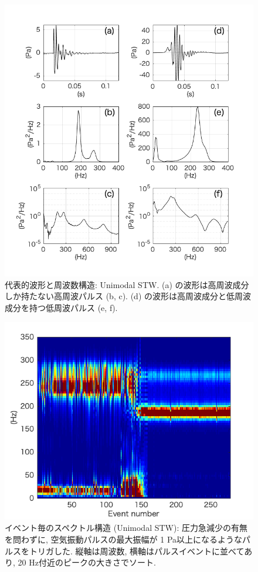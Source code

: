 \documentclass[12pt]{article}
\begin{document}
\begin{figure}[H]
\begin{center}
\includegraphics[scale=1] {Monowaveform.png} 
\caption{代表的波形と周波数構造: Unimodal STW. (a) の波形は高周波成分しか持たない高周波パルス (b, c). (d) の波形は高周波成分と低周波成分を持つ低周波パルス (e, f).}
\label{Monowaveform}
\end{center}
\end{figure}

\begin{figure}[H]
\begin{center}
\includegraphics[scale=1] {Monopspec.png} 
\caption[イベント毎のスペクトル構造: Unimodal STW]
{イベント毎のスペクトル構造 (Unimodal STW): 圧力急減少の有無を問わずに, 空気振動パルスの最大振幅が 1 Pa以上になるようなパルスをトリガした. 縦軸は周波数, 横軸はパルスイベントに並べてあり, 20 Hz付近のピークの大きさでソート.}
\label{Monopspec}
\end{center}
\end{figure} 
\end{document}

